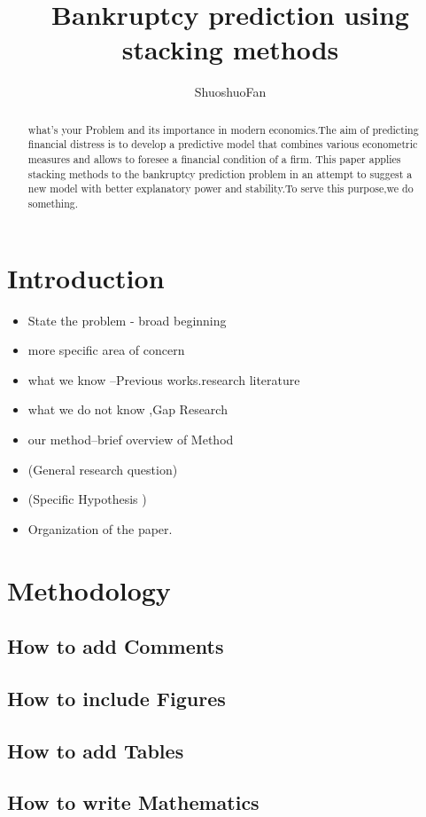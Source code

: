\documentclass[a4paper]{article}
\title{Bankruptcy prediction using stacking methods }
\author{ShuoshuoFan}
\begin{document}
\maketitle

\begin{abstract}
what's your Problem and  its importance in modern economics.The aim of predicting financial distress is 
to develop a predictive model that combines various econometric measures and allows to foresee a financial condition of a firm.
This paper applies stacking methods to the bankruptcy prediction problem in an attempt to suggest a new model with better explanatory power
and stability.To serve this purpose,we do something.
\end{abstract}

\section{Introduction}
\begin{itemize}
\item   State the problem - broad beginning
\item   more specific area of concern  
\item  what  we know --Previous works.research literature
\item  what we do not know ,Gap Research  
\item  our method--brief overview of Method
\item  (General research question)
\item   (Specific Hypothesis )
\item   Organization of the paper.
\end{itemize}

\section{Methodology}

\subsection{How to add Comments}
\subsection{How to include Figures}
\subsection{How to add Tables}
\subsection{How to write Mathematics}
\end{document}
